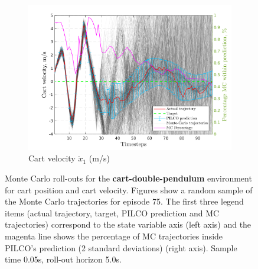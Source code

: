 \begin{figure}[htbp]
  \begin{subfigure}[b]{1\linewidth}
    \centering
    \includegraphics[height=0.4\textheight,width=1\textwidth]{Chapter3/Figures/cdp_MC_rollout_Ep_80_Dim_2.png} 
    \caption{Cart velocity $\dot{x}_1$ (m/s)} 
    \label{Fig:Re-cdp-cart-velocity} 
  \end{subfigure} 
\caption[Monte Carlo roll-outs for \textbf{cart-double-pendulum} cart position and cart velocity]{Monte Carlo roll-outs for the \textbf{cart-double-pendulum} environment for cart position and cart velocity. Figures show a random sample of the Monte Carlo trajectories for episode 75. The first three legend items (actual trajectory, target, PILCO prediction and MC trajectories) correspond to the state variable axis (left axis) and the magenta line shows the percentage of MC trajectories inside PILCO's prediction (2 standard deviations) (right axis). Sample time 0.05s, roll-out horizon 5.0s.}
\label{Fig:Re-cdp-MC-roll-outs-1} 
\end{figure}
 

